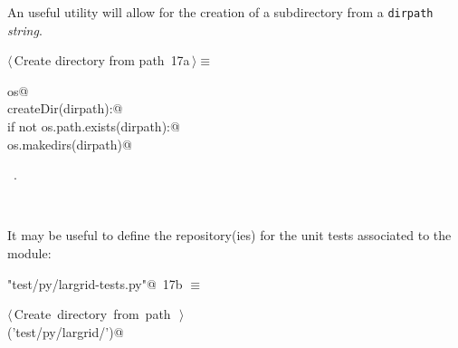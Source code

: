 \documentclass[11pt,oneside]{article}	%
\begin{document}
An useful utility will allow for the creation of a subdirectory from a \texttt{dirpath} \emph{string}.
\begin{flushleft} \small
\begin{minipage}{\linewidth} \label{scrap29}
\protect{}$\langle\,$Create directory from path\nobreak\ {\footnotesize 17a}$\,\rangle\equiv$
\vspace{-1ex}
\begin{list}{}{} \item
\mbox{}\verb@import os@\\
\mbox{}\verb@def createDir(dirpath):@\\
\mbox{}\verb@    if not os.path.exists(dirpath):@\\
\mbox{}\verb@        os.makedirs(dirpath)@\\
\mbox{}\verb@@{\NWsep}
\end{list}
\vspace{-1ex}
\footnotesize\addtolength{\baselineskip}{-1ex}
\begin{list}{}{\setlength{\itemsep}{-\parsep}\setlength{\itemindent}{-\leftmargin}}
\item \NWtxtMacroRefIn\ .
\end{list}
\end{minipage}\\[4ex]
\end{flushleft}

It may be useful to define the repository(ies) for the unit tests associated to the module:
\begin{flushleft} \small
\begin{minipage}{\linewidth} \label{scrap30}
\protect{}\verb@"test/py/largrid-tests.py"@\nobreak\ {\footnotesize 17b }$\equiv$
\vspace{-1ex}
\begin{list}{}{} \item
\mbox{}\verb@@\hbox{$\langle\,$Create directory from path\nobreak\ {\footnotesize {}}$\,\rangle$}\verb@@\\
\mbox{}\verb@createDir('test/py/largrid/')@\\
\mbox{}\verb@@{\NWsep}
\end{list}
\vspace{-2ex}
\end{minipage}\\[4ex]
\end{flushleft}





\end{document}
